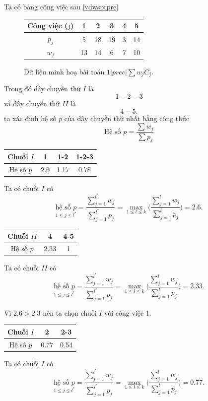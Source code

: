 \begin{vd}
Ta có bảng công việc sau \eqref{vdwsptpre}

\begin{figure}[h!]
	\centering
	\begin{tabular}{|c | c c c | c c |} 
	\hline
	Công việc ($j$) & 1 & 2 & 3 & 4 & 5 \\
	\hline\hline
	$p_j$ & 5 & 18 & 19 & 3 & 14 \\
	$w_j$ & 13 & 14 & 6 & 7 & 10 \\
	\hline
	\end{tabular}
\caption{\label{vdwsptpre} Dữ liệu minh hoạ bài toán $1 | prec | \sum w_j C_j$.}
\end{figure}

Trong đó dây chuyền thứ $I$ là $$1-2-3$$ và dây chuyền thứ $II$ là $$4-5.$$
ta xác định hệ số $p$ của dây chuyền thứ nhất bằng công thức $$\text{Hệ số }p=\frac{\sum w_j}{\sum p_j}$$

\begin{table}[h!]
	\centering
	\begin{tabular}{|c | c c c |} 
	\hline
	Chuỗi $I$ & 1 & 1-2 & 1-2-3 \\
	\hline\hline
	Hệ số $p$ & 2.6 & 1.17 & 0.78 \\
	\hline
	\end{tabular}
\end{table}
Ta có chuỗi $I$ có $$
	\underset{1 \leq j \leq l^*}{\text{hệ số }p}= \frac{\sum_{j=1}^{l^*}w_j}{\sum_{j=1}^{l^*}p_j} = \underset{1 \leq l \leq k}{\max}\Biggl(\frac{\sum_{j=1}^{l}w_j}{\sum_{j=1}^{l}p_j}\Biggl)=2.6.$$

\begin{table}[h!]
	\centering
	\begin{tabular}{|c | c c |} 
	\hline
	Chuỗi $II$ & 4 & 4-5 \\
	\hline\hline
	Hệ số $p$ & 2.33 & 1 \\
	\hline
	\end{tabular}
\end{table}
Ta có chuỗi $II$ có $$
	\underset{1 \leq j \leq l^*}{\text{hệ số }p}= \frac{\sum_{j=1}^{l^*}w_j}{\sum_{j=1}^{l^*}p_j} = \underset{1 \leq l \leq k}{\max}\Biggl(\frac{\sum_{j=1}^{l}w_j}{\sum_{j=1}^{l}p_j}\Biggl)=2.33.$$

Vì $2.6>2.3$ nên ta chọn chuỗi $I$ với công việc 1.

\begin{table}[h!]
	\centering
	\begin{tabular}{|c | c c |} 
	\hline
	Chuỗi $I$ & 2 & 2-3 \\
	\hline\hline
	Hệ số $p$ & 0.77 & 0.54 \\
	\hline
	\end{tabular}
\end{table}
Ta có chuỗi $I$ có $$
	\underset{1 \leq j \leq l^*}{\text{hệ số }p}= \frac{\sum_{j=1}^{l^*}w_j}{\sum_{j=1}^{l^*}p_j} = \underset{1 \leq l \leq k}{\max}\Biggl(\frac{\sum_{j=1}^{l}w_j}{\sum_{j=1}^{l}p_j}\Biggl)=0.77.$$


\end{vd}
